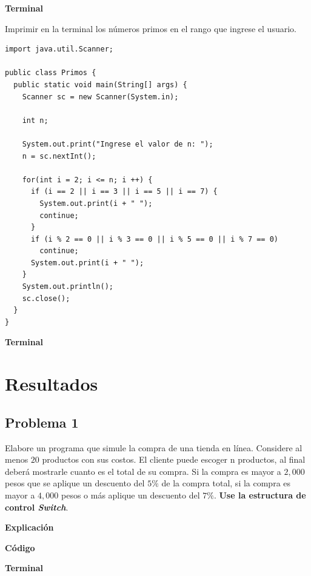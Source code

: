 \documentclass[11pt, twocolumn]{article}
\begin{document}
  \textbf{Terminal}

  Imprimir en la terminal los números primos en el rango que ingrese el usuario.

  \begin{lstlisting}
import java.util.Scanner;

public class Primos {
  public static void main(String[] args) {
    Scanner sc = new Scanner(System.in);

    int n;

    System.out.print("Ingrese el valor de n: ");
    n = sc.nextInt();

    for(int i = 2; i <= n; i ++) {
      if (i == 2 || i == 3 || i == 5 || i == 7) {
        System.out.print(i + " ");
        continue;
      }
      if (i % 2 == 0 || i % 3 == 0 || i % 5 == 0 || i % 7 == 0)
        continue;
      System.out.print(i + " ");
    }
    System.out.println();
    sc.close();
  }
}
  \end{lstlisting}

  \textbf{Terminal}

  \section*{Resultados}
  \subsection*{Problema 1}
  Elabore un programa que simule la compra de una tienda en línea. Considere al menos $20$ productos con sus costos. El cliente puede escoger n productos, al final deberá mostrarle cuanto es el total de su compra. Si la compra es mayor a $2,000$ pesos que se aplique un descuento del $5\%$ de la compra total, si la compra es mayor a $4,000$ pesos o más aplique un descuento del $7\%$. \textbf{Use la estructura de control \textit{Switch}}.

  \textbf{Explicación} 


  \textbf{Código}


  \textbf{Terminal}
\end{document}

